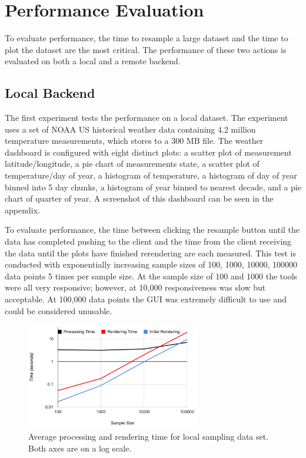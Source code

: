 \documentclass[letter,twocolumn]{article}
\begin{document}
\section{Performance Evaluation}%

To evaluate performance, the time to resample a large dataset and the time to plot the dataset are the most critical.
The performance of these two actions is evaluated on both a local and a remote backend.

\subsection{Local Backend}

The first experiment tests the performance on a local dataset.
The experiment uses a set of NOAA US historical weather data containing 4.2 million temperature measurements, which stores to a 300 MB file.
The weather dashboard is configured with eight distinct plots: a scatter plot of measurement latitude/longitude, a pie chart of measurements state, a scatter plot of temperature/day of year,  a histogram of temperature, a histogram of day of year binned into 5 day chunks, a histogram of year binned to nearest decade, and a pie chart of quarter of year.
A screenshot of this dashboard can be seen in the appendix.

To evaluate performance, the time between clicking the resample button until the data has completed pushing to the client and the time from the client receiving the data until the plots have finished rerendering are each measured.
This test is conducted with exponentially increasing sample sizes of 100, 1000, 10000, 100000 data points 5 times per sample size.
At the sample size of 100 and 1000 the tools were all very responsive; however, at 10,000 responsiveness was slow but acceptable.
At 100,000 data points the GUI was extremely difficult to use and could be considered unusable.

\begin{figure}
\begin{center}
\includegraphics[width=3in]{figs/weather_perf.png}
\end{center}
\caption{Average processing and rendering time for local sampling data set.  Both axes are on a log scale.}\label{fig:weather_perf}
\end{figure}
\end{document}
